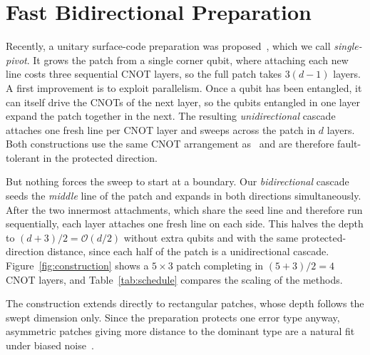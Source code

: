 \documentclass[conference]{IEEEtran}
\newcommand{\bigo}[1]{\mathcal{O}(#1)}
\begin{document}
\section{Fast Bidirectional Preparation}\label{sec:method}

Recently, a unitary surface-code preparation was
proposed~\cite{ref:unitaryprep}, which we call \emph{single-pivot}. It grows
the patch from a single corner qubit, where attaching each new line costs
three sequential CNOT layers, so the full patch takes $3(d{-}1)$ layers. A first improvement is to exploit
parallelism. Once a qubit has been entangled, it can itself drive the CNOTs
of the next layer, so the qubits entangled in one layer expand the patch
together in the next. The resulting \emph{unidirectional} cascade attaches
one fresh line per CNOT layer and sweeps across the patch in $d$ layers.
Both constructions use the same CNOT arrangement as~\cite{ref:unitaryprep}
and are therefore fault-tolerant in the protected direction.

But nothing forces the sweep to start at a boundary. Our
\emph{bidirectional} cascade seeds the \emph{middle} line of the patch and
expands in both directions simultaneously. After the two innermost
attachments, which share the seed line and therefore run sequentially, each
layer attaches one fresh line on each side. This halves the depth to
$(d{+}3)/2 = \bigo{d/2}$ without extra qubits and with the same
protected-direction distance, since each half of the patch is a
unidirectional cascade. Figure~\ref{fig:construction} shows a $5\times3$
patch completing in $(5{+}3)/2=4$ CNOT layers, and Table~\ref{tab:schedule}
compares the scaling of the methods.

The construction extends directly to rectangular patches, whose depth
follows the swept dimension only. Since the preparation protects one error
type anyway, asymmetric patches giving more distance to the dominant type
are a natural fit under biased noise~\cite{bonilla2021xzzx}.
\end{document}
